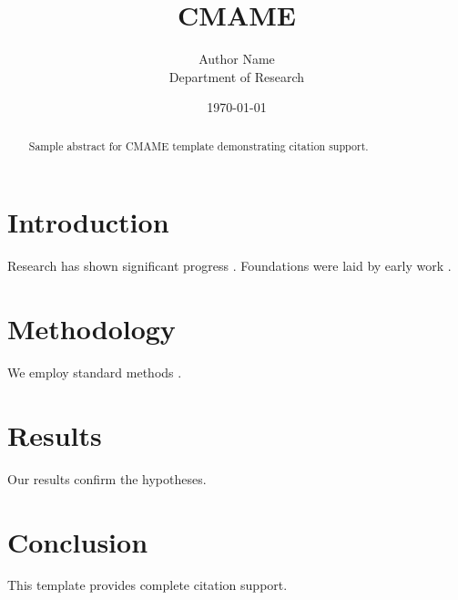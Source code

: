 ﻿\documentclass{elsarticle}
\title{CMAME}
\author{Author Name \\ \small Department of Research}
\date{\today}
\begin{document}
\maketitle

\begin{abstract}
Sample abstract for CMAME template demonstrating citation support.
\end{abstract}

\section{Introduction}
Research has shown significant progress \citep{einstein1905}. Foundations were laid by early work \citep{turing1950}.

\section{Methodology}
We employ standard methods \citep{knuth1984}.

\section{Results}
Our results confirm the hypotheses.

\section{Conclusion}
This template provides complete citation support.



\end{document}

